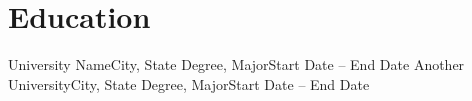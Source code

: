 \section{Education}
  \resumeSubHeadingListStart
    \resumeSubheading
      {University Name}{City, State}
      {Degree, Major}{Start Date -- End Date}
    \resumeSubheading
      {Another University}{City, State}
      {Degree, Major}{Start Date -- End Date}
  \resumeSubHeadingListEnd
